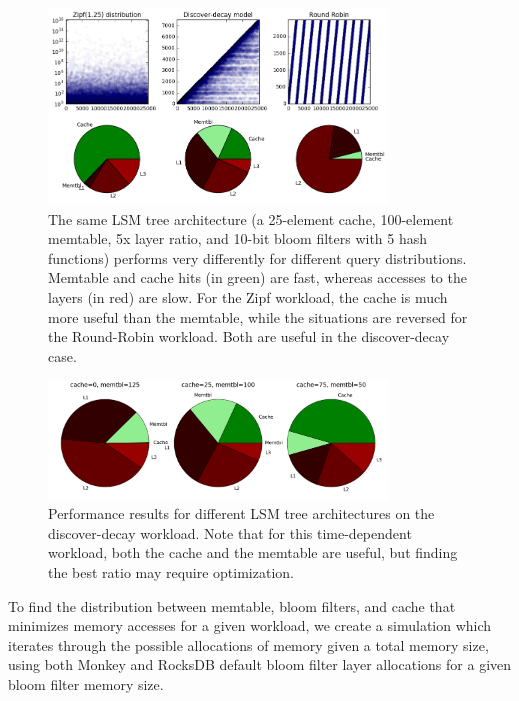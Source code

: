 \documentclass{sig-alternate-05-2015}
\begin{document}
\begin{figure}[!htb]
\begin{center}
\includegraphics[width=9cm]{sametree-diffqs.png}
\end{center}
\caption{The same LSM tree architecture (a 25-element cache, 100-element
memtable, 5x layer ratio, and 10-bit bloom filters with 5 hash functions)
performs very differently for different query distributions. Memtable and cache
hits (in green) are fast, whereas accesses to the layers (in red) are slow. For
the Zipf workload, the cache is much more useful than the memtable, while the
situations are reversed for the Round-Robin workload. Both are useful in the
discover-decay case.}
\label{fig:sametree-diffqs}
\end{figure}

\begin{figure}[!htb]
\begin{center}
\includegraphics[width=9cm]{sameqs-difftree.png}
\end{center}
\caption{Performance results for different LSM tree architectures on the
discover-decay workload. Note that for this time-dependent workload, both the
cache and the memtable are useful, but finding the best ratio may require
optimization.}
\label{fig:sameqs-difftree}
\end{figure}

To find the distribution between memtable, bloom filters, and cache that minimizes memory accesses for a given workload, we create a simulation which iterates through the possible allocations of memory given a total memory size, using both Monkey and RocksDB default bloom filter layer allocations for a given bloom filter memory size. 
\end{document}
